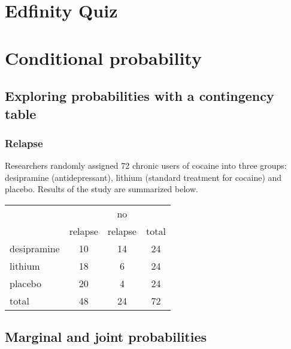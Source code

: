 \documentclass[slidestop,compress,mathserif]{beamer}
\begin{document}
\section{Edfinity Quiz}

\section{Conditional probability}


\subsection{Exploring probabilities with a contingency table}


\begin{frame}
\frametitle{Relapse}

Researchers randomly assigned 72 chronic users of cocaine into three groups: desipramine (antidepressant), lithium (standard treatment for cocaine) and placebo. Results of the study are summarized below.

{\small
\begin{center}
\begin{tabular}{l | c c | c}
			& 		& no 		&  \\
			& relapse	& relapse	& total \\
\hline
desipramine	& 10		& 14		& 24 \\
lithium		& 18		& 6		& 24 \\
placebo		& 20		& 4		& 24 \\
\hline
total			& 48		& 24		& 72
\end{tabular}
\end{center}
}


\end{frame}


\subsection{Marginal and joint probabilities}

\end{document}
